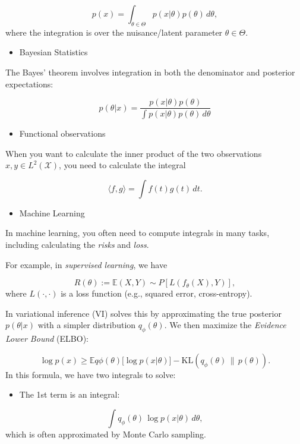 \documentclass[
  letterpaper,
  DIV=11,
  numbers=noendperiod]{scrreprt}
\providecommand{\tightlist}{%
  \setlength{\itemsep}{0pt}\setlength{\parskip}{0pt}}
\begin{document}
\[
  p(x) = \int_{\theta\in\Theta}     p(x|\theta)p(\theta)\,d\theta,
\] where the integration is over the nuisance/latent parameter
\(\theta\in\Theta\).

\begin{itemize}
\tightlist
\item
  Bayesian Statistics
\end{itemize}

The Bayes' theorem involves integration in both the denominator and
posterior expectations:

\[
p(\theta|x) = \frac{p(x|\theta)p(\theta)}{\int p(x|\theta)p(\theta)\,d\theta}
\]

\begin{itemize}
\tightlist
\item
  Functional observations
\end{itemize}

When you want to calculate the inner product of the two observations
\(x,y\in L^2(\mathcal X)\), you need to calculate the integral

\[
\langle f,g \rangle = \int f(t)g(t)\,dt.
\]

\begin{itemize}
\tightlist
\item
  Machine Learning
\end{itemize}

In machine learning, you often need to compute integrals in many tasks,
including calculating the \emph{risks} and \emph{loss}.

For example, in \emph{supervised learning}, we have

\[R(\theta) := \mathbb E{(X,Y) \sim P}[L(f_\theta(X), Y)],
\] where \(L(\cdot,\cdot)\) is a loss function (e.g., squared error,
cross-entropy).

In variational inference (VI) solves this by approximating the true
posterior \(p(\theta|x)\) with a simpler distribution
\(q_\phi(\theta)\). We then maximize the \emph{Evidence Lower Bound}
(ELBO):

\[
\log p(x) \geq \mathbb{E}{q\phi(\theta)}\big[\log p(x|\theta)\big] - \text{KL}(q_\phi(\theta)\,\|\,p(\theta)).
\] In this formula, we have two integrals to solve:

\begin{itemize}
\tightlist
\item
  The 1st term is an integral:
\end{itemize}

\[\int q_\phi(\theta)\,\log p(x|\theta)\, d\theta,\] which is often
approximated by Monte Carlo sampling.
\end{document}

